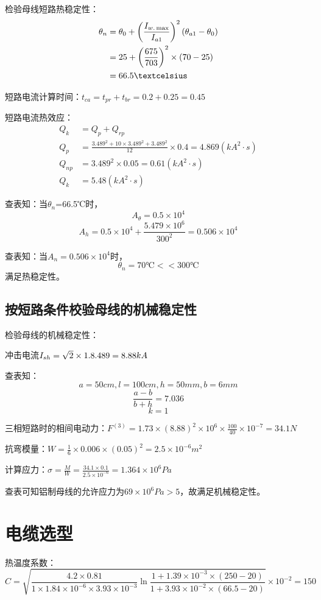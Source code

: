 检验母线短路热稳定性：
\begin{align}
	\theta _n&=\theta _0+\left( \frac{I_{w.\max}}{I_{a1}} \right) ^2\left( \theta _{a1}-\theta _0 \right) \notag
	\\
	&=25+\left( \frac{675}{703} \right) ^2\times \left( 70-25 \right) \notag
	\\
	&=66.5℃
\end{align}

短路电流计算时间：$t_{ca}=t_{pr}+t_{br}=0.2+0.25=0.45$

短路电流热效应：
\begin{align}
			Q_k&=Q_p+Q_{rp}
			\\
			Q_p&=\frac{3.489^2+10\times 3.489^2+3.489^2}{12}\times 0.4=4.869\left( kA^2\cdot s \right) 
			\\
			Q_{np}&=3.489^2\times 0.05=0.61\left( kA^2\cdot s \right) 
			\\
			Q_k&=5.48\left( kA^2\cdot s \right) 
\end{align}

查表知：当$\theta_n$=66.5℃时，$$A_\theta=0.5\times10^4$$
$$A_h=0.5\times10^4+\frac{5.479\times10^6}{300^2}=0.506\times10^4$$

查表知：当$A_n=0.506\times10^4$时，
$$\theta_n=70℃<<300℃$$满足热稳定性。

\subsection{按短路条件校验母线的机械稳定性}
检验母线的机械稳定性：

冲击电流$I_{sh}=\sqrt{2}\times1.8\time 3.489=8.88kA$

查表知：$$a=50cm,l=100cm,h=50mm,b=6mm$$
$$\frac{a-b}{b+h}=7.036$$
$$k=1$$

三相短路时的相间电动力：$F^{\left( 3 \right)}=1.73\times \left( 8.88 \right) ^2\times 10^6\times \frac{100}{40}\times 10^{-7}=34.1N$

抗弯模量：$W=\frac{1}{6}\times 0.006\times \left( 0.05 \right) ^2=2.5\times 10^{-6}m^2$

计算应力：$\sigma =\frac{M}{W}=\frac{34.1\times 0.1}{2.5\times 10^{-6}}=1.364\times 10^6Pa$

查表可知铝制母线的允许应力为$69\times10^6Pa>5$，故满足机械稳定性。
\section{电缆选型}
热温度系数：
$$
C=\sqrt{\frac{4.2\times 0.81}{1\times 1.84\times 10^{-6}\times 3.93\times 10^{-3}}\ln \frac{1+1.39\times 10^{-3}\times \left( 250-20 \right)}{1+3.93\times 10^{-2}\times \left( 66.5-20 \right)}}\times 10^{-2}=150
$$

